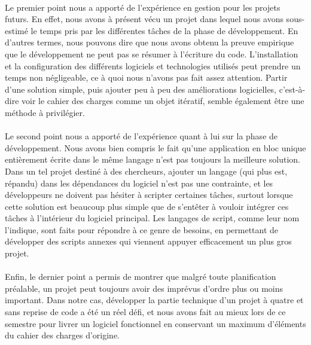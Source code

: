 \paragraph{}
Le premier point nous a apporté de l'expérience en gestion pour les projets futurs. En effet, nous avons à présent vécu un projet dans lequel nous avons sous-estimé le temps pris par les différentes tâches de la phase de développement. En d'autres termes, nous pouvons dire que nous avons obtenu la preuve empirique que le développement ne peut pas se résumer à l'écriture du code. L'installation et la configuration des différents logiciels et technologies utilisés peut prendre un temps non négligeable, ce à quoi nous n'avons pas fait assez attention. Partir d'une solution simple, puis ajouter peu à peu des améliorations logicielles, c'est-à-dire voir le cahier des charges comme un objet itératif, semble également être une méthode à privilégier.

\paragraph{}
Le second point nous a apporté de l'expérience quant à lui sur la phase de développement. Nous avons bien compris le fait qu'une application en bloc unique entièrement écrite dans le même langage n'est pas toujours la meilleure solution. Dans un tel projet destiné à des chercheurs, ajouter un langage (qui plus est, répandu) dans les dépendances du logiciel n'est pas une contrainte, et les développeurs ne doivent pas hésiter à scripter certaines tâches, surtout lorsque cette solution est beaucoup plus simple que de s'entêter à vouloir intégrer ces tâches à l'intérieur du logiciel principal. Les langages de script, comme leur nom l'indique, sont faits pour répondre à ce genre de besoins, en permettant de développer des scripts annexes qui viennent appuyer efficacement un plus gros projet.

\paragraph{}
Enfin, le dernier point a permis de montrer que malgré toute planification préalable, un projet peut toujours avoir des imprévus d'ordre plus ou moins important. Dans notre cas, développer la partie technique d'un projet à quatre et sans reprise de code a été un réel défi, et nous avons fait au mieux lors de ce semestre pour livrer un logiciel fonctionnel en conservant un maximum d'éléments du cahier des charges d'origine.